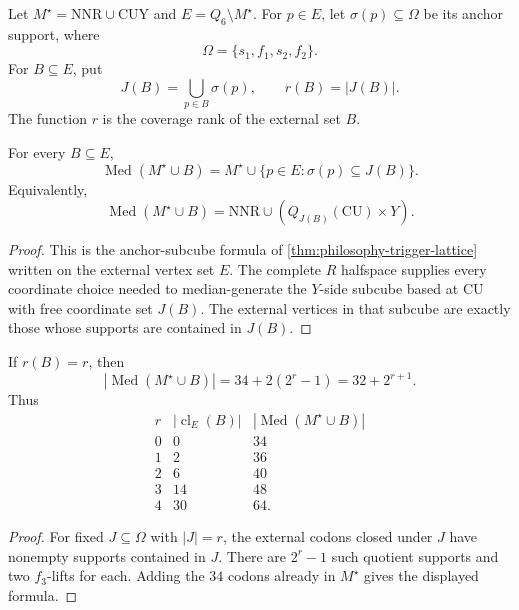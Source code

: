 \begin{definition}
\label{def:philosophy-coverage-rank}
Let $M^{\star}=\mathrm{NNR}\cup\mathrm{CUY}$ and
$E=Q_{6}\setminus M^{\star}$. For $p\in E$, let
$\sigma(p)\subseteq\Omega$ be its anchor support, where
$$
  \Omega=\{s_{1},f_{1},s_{2},f_{2}\}.
$$
For $B\subseteq E$, put
$$
  J(B)=\bigcup_{p\in B}\sigma(p),
  \qquad
  r(B)=|J(B)|.
$$
The function $r$ is the coverage rank of the external set $B$.
\end{definition}

\begin{theorem}
\label{thm:philosophy-coverage-closure-formula}
For every $B\subseteq E$,
$$
  \operatorname{Med}(M^{\star}\cup B)
  =
  M^{\star}\cup\{p\in E:\sigma(p)\subseteq J(B)\}.
$$
Equivalently,
$$
  \operatorname{Med}(M^{\star}\cup B)
  =
  \mathrm{NNR}\cup(Q_{J(B)}(\mathrm{CU})\times Y).
$$
\end{theorem}
\begin{proof}
This is the anchor-subcube formula of
\autoref{thm:philosophy-trigger-lattice} written on the external
vertex set $E$. The complete $R$ halfspace supplies every coordinate
choice needed to median-generate the $Y$-side subcube based at
$\mathrm{CU}$ with free coordinate set $J(B)$. The external vertices in
that subcube are exactly those whose supports are contained in $J(B)$.
\end{proof}


\begin{corollary}
\label{cor:philosophy-coverage-rank-size}
If $r(B)=r$, then
$$
  |\operatorname{Med}(M^{\star}\cup B)|
  =
  34+2(2^{r}-1)
  =
  32+2^{r+1}.
$$
Thus
$$
\begin{array}{c|r|r}
  r & |\operatorname{cl}_{E}(B)| & |\operatorname{Med}(M^{\star}\cup B)|\\
  \hline
  0 & 0 & 34\\
  1 & 2 & 36\\
  2 & 6 & 40\\
  3 & 14 & 48\\
  4 & 30 & 64.
\end{array}
$$
\end{corollary}
\begin{proof}
For fixed $J\subseteq\Omega$ with $|J|=r$, the external codons closed
under $J$ have nonempty supports contained in $J$. There are
$2^{r}-1$ such quotient supports and two $f_{3}$-lifts for each.
Adding the $34$ codons already in $M^{\star}$ gives the displayed
formula.
\end{proof}


